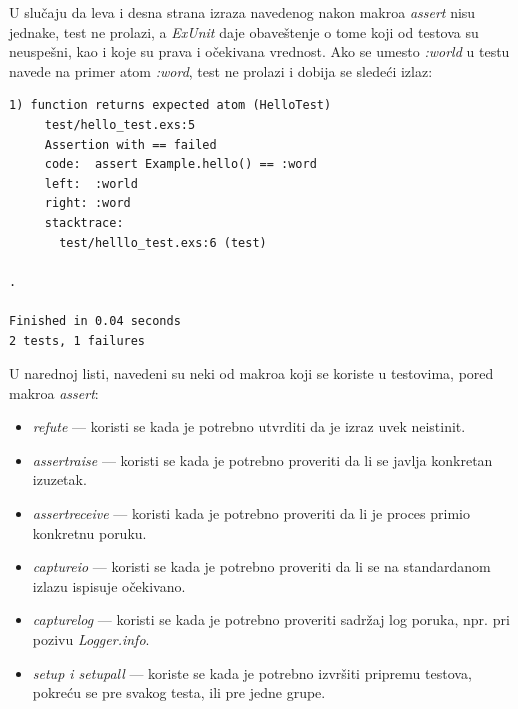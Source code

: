\documentclass[12pt,oneside]{memoir}
\begin{document}
\par U slučaju da leva i desna strana izraza navedenog nakon makroa \emph{assert} nisu jednake, test ne prolazi, a \emph{ExUnit} daje obaveštenje o tome koji od testova su neuspešni, kao i koje su prava i očekivana vrednost. Ako se umesto \emph{:world} u testu navede na primer atom \emph{:word}, test ne prolazi i dobija se sledeći izlaz:

\begin{lstlisting}[style=DOS]
1) function returns expected atom (HelloTest)
     test/hello_test.exs:5
     Assertion with == failed
     code:  assert Example.hello() == :word
     left:  :world
     right: :word
     stacktrace:
       test/helllo_test.exs:6 (test)

.

Finished in 0.04 seconds
2 tests, 1 failures
\end{lstlisting}

\par U narednoj listi, navedeni su neki od makroa koji se koriste u testovima, pored makroa \emph{assert}: 
 \begin{itemize}
 \item \emph{refute} --- koristi se kada je potrebno utvrditi da je izraz uvek neistinit. 
 \item \emph {assert{\textunderscore}raise} --- koristi se kada je potrebno proveriti da li se javlja konkretan izuzetak.
 \item \emph{assert{\textunderscore}receive} --- koristi kada je potrebno proveriti da li je proces primio konkretnu poruku.
 \item \emph {capture{\textunderscore}io} --- koristi se kada je potrebno proveriti da li se na standardanom izlazu ispisuje očekivano.
 \item \emph{capture{\textunderscore}log} --- koristi se kada je potrebno proveriti sadržaj log poruka, npr. pri pozivu \emph{Logger.info}.
 \item \emph{setup i setup{\textunderscore}all} --- koriste se kada je potrebno izvršiti pripremu testova, pokreću se pre svakog testa, ili pre jedne grupe.
 \end{itemize}
 
 \par
\end{document}
